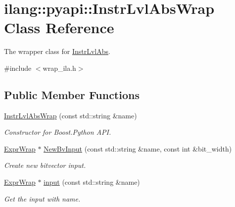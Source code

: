 \hypertarget{classilang_1_1pyapi_1_1_instr_lvl_abs_wrap}{}\section{ilang\+:\+:pyapi\+:\+:Instr\+Lvl\+Abs\+Wrap Class Reference}
\label{classilang_1_1pyapi_1_1_instr_lvl_abs_wrap}


The wrapper class for \mbox{\hyperlink{classilang_1_1_instr_lvl_abs}{Instr\+Lvl\+Abs}}.  




{\ttfamily \#include $<$wrap\+\_\+ila.\+h$>$}

\subsection*{Public Member Functions}
\begin{DoxyCompactItemize}
\item 
\mbox{\label{classilang_1_1pyapi_1_1_instr_lvl_abs_wrap_afbe797b1eff5bbbc67f3ca910d3fa366}} 
\mbox{\hyperlink{classilang_1_1pyapi_1_1_instr_lvl_abs_wrap_afbe797b1eff5bbbc67f3ca910d3fa366}{Instr\+Lvl\+Abs\+Wrap}} (const std\+::string \&name)
\begin{DoxyCompactList}\small\item\em Constructor for Boost.\+Python A\+PI. \end{DoxyCompactList}\item 
\mbox{\label{classilang_1_1pyapi_1_1_instr_lvl_abs_wrap_a83822f407368b569dfd89c6c435adc50}} 
\mbox{\hyperlink{classilang_1_1pyapi_1_1_expr_wrap}{Expr\+Wrap}} $\ast$ \mbox{\hyperlink{classilang_1_1pyapi_1_1_instr_lvl_abs_wrap_a83822f407368b569dfd89c6c435adc50}{New\+Bv\+Input}} (const std\+::string \&name, const int \&bit\+\_\+width)
\begin{DoxyCompactList}\small\item\em Create new bitvector input. \end{DoxyCompactList}\item 
\mbox{\label{classilang_1_1pyapi_1_1_instr_lvl_abs_wrap_a4b0b65e4355534cfb32b77d9a6599e54}} 
\mbox{\hyperlink{classilang_1_1pyapi_1_1_expr_wrap}{Expr\+Wrap}} $\ast$ \mbox{\hyperlink{classilang_1_1pyapi_1_1_instr_lvl_abs_wrap_a4b0b65e4355534cfb32b77d9a6599e54}{input}} (const std\+::string \&name)
\begin{DoxyCompactList}\small\item\em Get the input with name. \end{DoxyCompactList}\end{DoxyCompactItemize}


